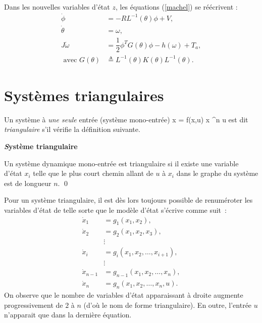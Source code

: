 Dans les nouvelles variables d'état $z$, les équations (\ref{machel}) se
réécrivent : 
\begin{equation*} \begin{split}
\dot\phi &= -RL^{-1}(\theta)\phi+ V,\\
\dot \theta &= \omega,\\
J\dot\omega &= \dfrac{1}{2} \phi^T G(\theta) \phi - h(\omega) + T_a,\\
\mbox{ avec } G(\theta) &\triangleq  L^{-1}(\theta)K(\theta)L^{-1}(\theta).
\end{split} \end{equation*}
\vv

\section{Systèmes triangulaires} \label{triangulaire}
 
 Un système à {\it une seule} entrée (système mono-entrée)
 \eqn
 \dot x = f(x,u) \hh \hh x \in \real^n \hh \hh u \in \real \label{mono}
 \eeqn
est dit {\it triangulaire} s'il vérifie la définition suivante.

\begin{definition}{\bf \emph Système triangulaire}

Un système dynamique mono-entrée est triangulaire si il existe une variable d'état $x_i$ telle que le plus court chemin allant de $u$ à $x_i$ dans le graphe du système est de longueur $n$. \qed
\end{definition}

Pour un système triangulaire, il est dès lors toujours possible de renuméroter les variables d'état de telle sorte que le modèle d'état s'écrive comme suit~:
\begin{equation} \begin{split} \label{systriang}
\dot x_1 &= g_1(x_1,x_2),  \\
\dot x_2 &= g_2(x_1,x_2, x_3),  \\
&\vdots  \\
\dot x_i &= g_i(x_1,x_2, \dots ,x_{i+1}),  \\
&\vdots  \\
\dot x_{n-1} &= g_{n-1}(x_1,x_2, \dots ,x_n),  \\
\dot x_n &= g_n(x_1,x_2, \dots ,x_n,u).  
\end{split} \end{equation}
On observe que le nombre de variables d'état apparaissant à droite augmente progressivement de $2$ à $n$ (d'où le nom de forme triangulaire). En outre, l'entrée $u$ n'apparait que dans la dernière équation.
\vv

